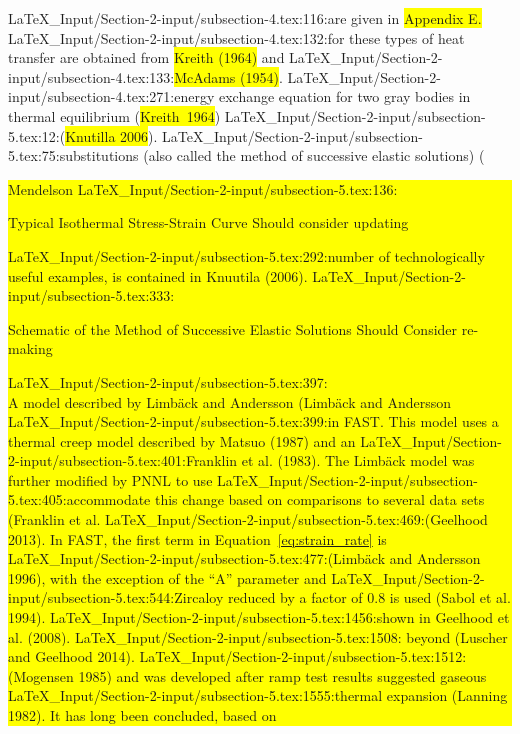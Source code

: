 {{{LaTeX_Input/Section-2-input/subsection-4.tex:116:are given in \colorbox{yellow}{Appendix E.}
LaTeX_Input/Section-2-input/subsection-4.tex:132:for these types of heat transfer are obtained from \colorbox{yellow}{Kreith (1964)} and
LaTeX_Input/Section-2-input/subsection-4.tex:133:\colorbox{yellow}{McAdams (1954)}.
LaTeX_Input/Section-2-input/subsection-4.tex:271:energy exchange equation for two gray bodies in thermal equilibrium (\colorbox{yellow}{Kreith~1964})
LaTeX_Input/Section-2-input/subsection-5.tex:12:(\colorbox{yellow}{Knutilla 2006}).
LaTeX_Input/Section-2-input/subsection-5.tex:75:substitutions (also called the method of successive elastic solutions) (\colorbox{yellow}{Mendelson
LaTeX_Input/Section-2-input/subsection-5.tex:136:    \caption{Typical Isothermal Stress-Strain Curve \colorbox{yellow}{Should consider updating}}
LaTeX_Input/Section-2-input/subsection-5.tex:292:number of technologically useful examples, is contained in \colorbox{yellow}{Knuutila (2006)}.
LaTeX_Input/Section-2-input/subsection-5.tex:333:    \caption{Schematic of the Method of Successive Elastic Solutions \colorbox{yellow}{Should Consider re-making}}
LaTeX_Input/Section-2-input/subsection-5.tex:397:\\ A model described by Limb\"{a}ck and Andersson (\colorbox{yellow}{Limb\"{a}ck and Andersson
LaTeX_Input/Section-2-input/subsection-5.tex:399:in FAST.  This model uses a thermal creep model described by \colorbox{yellow}{Matsuo (1987)} and an
LaTeX_Input/Section-2-input/subsection-5.tex:401:\colorbox{yellow}{Franklin et al. (1983)}. The Limb\"{a}ck model was further modified by PNNL to use
LaTeX_Input/Section-2-input/subsection-5.tex:405:accommodate this change based on comparisons to several data sets (\colorbox{yellow}{Franklin et al.
LaTeX_Input/Section-2-input/subsection-5.tex:469:(\colorbox{yellow}{Geelhood 2013}).  In FAST, the first term in Equation~\ref{eq:strain_rate} is
LaTeX_Input/Section-2-input/subsection-5.tex:477:(\colorbox{yellow}{Limb\"{a}ck and Andersson 1996}), with the exception of the ``A'' parameter and
LaTeX_Input/Section-2-input/subsection-5.tex:544:Zircaloy reduced by a factor of 0.8 is used (\colorbox{yellow}{Sabol et al. 1994}).
LaTeX_Input/Section-2-input/subsection-5.tex:1456:shown in \colorbox{yellow}{Geelhood et al. (2008)}.
LaTeX_Input/Section-2-input/subsection-5.tex:1508: beyond  \colorbox{yellow}{(Luscher and Geelhood 2014)}.
LaTeX_Input/Section-2-input/subsection-5.tex:1512:(\colorbox{yellow}{Mogensen 1985}) and was developed after ramp test results suggested gaseous
LaTeX_Input/Section-2-input/subsection-5.tex:1555:thermal expansion (\colorbox{yellow}{Lanning 1982}). It has long been concluded, based on
}}}}}}
